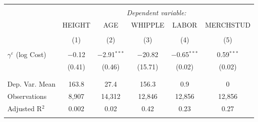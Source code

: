 
\begin{tabular}{@{\extracolsep{5pt}}lccccc} 
\\[-1.8ex]\hline 
\hline \\[-1.8ex] 
 & \multicolumn{5}{c}{\textit{Dependent variable:}} \\ 
\cline{2-6} 
 & HEIGHT & AGE & WHIPPLE & LABOR & MERCHSTUD \\ 
\\[-1.8ex] & (1) & (2) & (3) & (4) & (5)\\ 
\hline \\[-1.8ex] 
 $\gamma^{\varepsilon}$ (log Cost) & $-$0.12 & $-$2.91$^{***}$ & $-$20.82 & $-$0.65$^{***}$ & 0.59$^{***}$ \\ 
  & (0.41) & (0.46) & (15.71) & (0.02) & (0.02) \\ 
  & & & & & \\ 
\hline \\[-1.8ex] 
Dep. Var. Mean & 163.8 & 27.4 & 156.3 & 0.9 & 0 \\ 
Observations & 8,907 & 14,312 & 12,846 & 12,856 & 12,856 \\ 
Adjusted R$^{2}$ & 0.002 & 0.02 & 0.42 & 0.23 & 0.27 \\ 
\hline 
\hline \\[-1.8ex] 
\end{tabular} 

